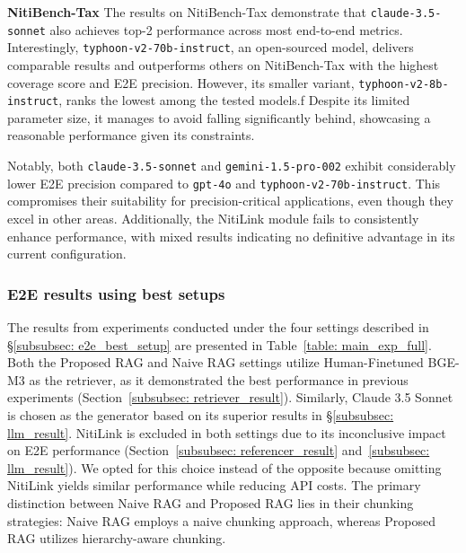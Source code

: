 \textbf{NitiBench-Tax} The results on NitiBench-Tax demonstrate that \texttt{claude-3.5-sonnet} also achieves top-2 performance across most end-to-end metrics. 
%
Interestingly, \texttt{typhoon-v2-70b-instruct}, an open-sourced model, delivers comparable results and outperforms others on NitiBench-Tax with the highest coverage score and E2E precision. 
%
However, its smaller variant, \texttt{typhoon-v2-8b-instruct}, ranks the lowest among the tested models.f
Despite its limited parameter size, it manages to avoid falling significantly behind, showcasing a reasonable performance given its constraints.

Notably, both \texttt{claude-3.5-sonnet} and \texttt{gemini-1.5-pro-002} exhibit considerably lower E2E precision compared to \texttt{gpt-4o} and \texttt{typhoon-v2-70b-instruct}. This compromises their suitability for precision-critical applications, even though they excel in other areas. Additionally, the NitiLink module fails to consistently enhance performance, with mixed results indicating no definitive advantage in its current configuration.

\subsubsection{E2E results using best setups}
\label{subsubsec: e2e_best_result}

The results from experiments conducted under the four settings described in \S\ref{subsubsec: e2e_best_setup} are presented in Table~\ref{table: main_exp_full}. 
%
Both the Proposed RAG and Naive RAG settings utilize Human-Finetuned BGE-M3 as the retriever, as it demonstrated the best performance in previous experiments (Section~\ref{subsubsec: retriever_result}). 
%
Similarly, Claude 3.5 Sonnet is chosen as the generator based on its superior results in \S\ref{subsubsec: llm_result}. 
%
NitiLink is excluded in both settings due to its inconclusive impact on E2E performance (Section~\ref{subsubsec: referencer_result} and~\ref{subsubsec: llm_result}). 
%
We opted for this choice instead of the opposite because omitting NitiLink yields similar performance while reducing API costs. 
%
The primary distinction between Naive RAG and Proposed RAG lies in their chunking strategies: Naive RAG employs a naive chunking approach, whereas Proposed RAG utilizes hierarchy-aware chunking.


